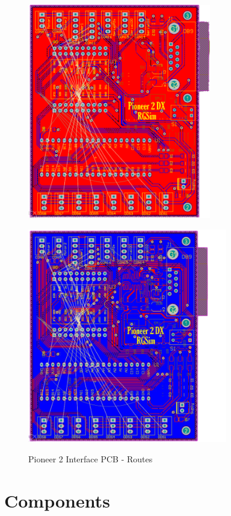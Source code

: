 \documentclass[../../monografia.tex]{subfiles}
\begin{document}
\begin{figure}[h!]
    \centering
    \caption{Pioneer 2 Interface PCB - Routes}
    \begin{minipage}[t]{0.48\textwidth}
        \centering
        \includegraphics[width=8cm]{pcb_1-routes.png}
        \label{fig: Pioneer 2 Interface PCB - Front routes}
    \end{minipage}
    \hfill
    \begin{minipage}[t]{0.48\textwidth}
        \centering
        \includegraphics[width=8.7cm]{pcb_2-routes.png}
        \label{fig: Pioneer 2 Interface PCB - Back routes}
    \end{minipage}
    \label{fig: Pioneer 2 Interface PCB - Routes}
\end{figure}

\section{Components}


\end{document}
